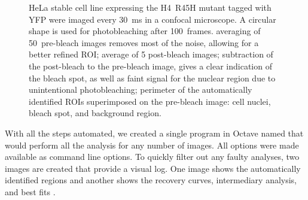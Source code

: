 \begin{figure}
  \centering
  \hfill
  \hfill
               {HeLa stable cell line expressing the H4~R45H mutant
                 tagged with YFP were imaged every \SI{30}{\ms} in a
                 confocal microscope. A circular shape is used for
                 photobleaching after 100~frames.
                 averaging of 50~pre-bleach images removes most of the
                 noise, allowing for a better refined ROI;
                 average of 5 post-bleach images;
                 subtraction of the post-bleach to the pre-bleach
                 image, gives a clear indication of the bleach spot,
                 as well as faint signal for the nuclear region due to
                 unintentional photobleaching;
                 perimeter of the automatically identified ROIs
                 superimposed on the pre-bleach image: cell nuclei,
                 bleach spot, and background region.  }
               \label{fig:software:frap-roi}
\end{figure}


With all the steps automated, we created a single program in Octave
named  that would perform all the
analysis for any number of images.  All options were made
available as command line options.
To quickly filter out any faulty analyses,
two images are created that provide a visual log.  One image shows the
automatically identified regions  and
another shows the recovery curves, intermediary analysis, and best fits
.

